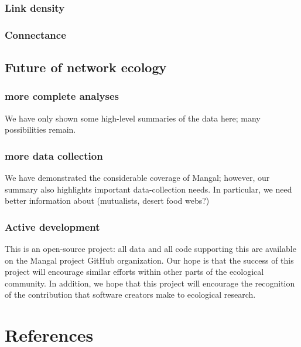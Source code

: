 \hypertarget{link-density}{%
\subsubsection{Link density}\label{link-density}}

\hypertarget{connectance}{%
\subsubsection{Connectance}\label{connectance}}

\hypertarget{future-of-network-ecology}{%
\subsection{Future of network ecology}\label{future-of-network-ecology}}

\hypertarget{more-complete-analyses}{%
\subsubsection{more complete analyses}\label{more-complete-analyses}}

We have only shown some high-level summaries of the data here; many
possibilities remain.

\hypertarget{more-data-collection}{%
\subsubsection{more data collection}\label{more-data-collection}}

We have demonstrated the considerable coverage of Mangal; however, our
summary also highlights important data-collection needs. In particular,
we need better information about (mutualists, desert food webs?)

\hypertarget{active-development}{%
\subsubsection{Active development}\label{active-development}}

This is an open-source project: all data and all code supporting this
are available on the Mangal project GitHub organization. Our hope is
that the success of this project will encourage similar efforts within
other parts of the ecological community. In addition, we hope that this
project will encourage the recognition of the contribution that software
creators make to ecological research.

\hypertarget{references}{%
\section{References}\label{references}}
